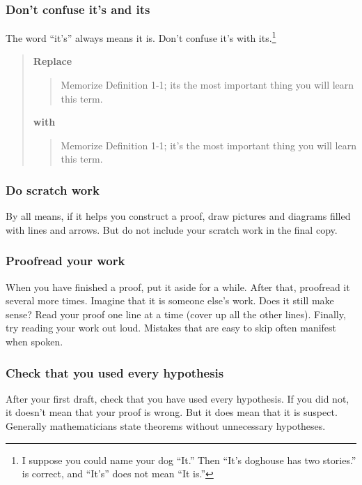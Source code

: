 \documentclass[12pt]{article}
\newcounter{ex}\setcounter{ex}{0}
\newcounter{id}\setcounter{id}{0}
\newcounter{se}\setcounter{se}{0}
\begin{document}
 \subsubsection{  Don't confuse it's and its}

The word ``it's'' always means it is. Don't confuse it's with its.\footnote{I suppose you
could name your dog ``It.'' Then ``It's doghouse has two stories.'' is correct,
and ``It's'' does not mean ``It is.''} 

\begin{quote}
\textbf{\textbf{Replace}}
\begin{quote}
Memorize Definition 1-1; its the most important thing you will learn
this term.
\end{quote}
\textbf{with}
\begin{quote}
Memorize Definition 1-1; it's the most important thing you will learn
this term.
\end{quote}
\end{quote}




 \subsubsection{ Do scratch work}

By all means, if it helps you construct a proof, draw pictures and
diagrams filled with lines and arrows.  But do not include your scratch
work in the final copy.

 \subsubsection{ Proofread your work}

When you have finished a proof, put it aside for a while.  After that,
proofread it several more times. Imagine that it is someone else's
work.  Does it still make sense?  Read your proof one line at a time
(cover up all the other lines). Finally, try reading your work out
loud. Mistakes that are easy to skip often manifest when spoken.


 \subsubsection{Check that you used every hypothesis}

After your first draft, check that you have used every hypothesis.
If you did not, it doesn't mean that your proof is wrong.  But it
does mean that it is  suspect.  Generally mathematicians
state theorems without unnecessary hypotheses.
\end{document}
